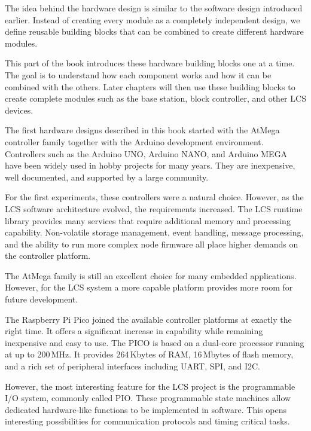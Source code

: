The idea behind the hardware design is similar to the software design introduced earlier. Instead of 
creating every module as a completely independent design, we define reusable building blocks that can 
be combined to create different hardware modules.

This part of the book introduces these hardware building blocks one at a time. The goal is to 
understand how each component works and how it can be combined with the others. Later chapters will 
then use these building blocks to create complete modules such as the base station, block controller, 
and other LCS devices.


The first hardware designs described in this book started with the AtMega controller family together 
with the Arduino development environment. Controllers such as the Arduino UNO, Arduino NANO, and 
Arduino MEGA have been widely used in hobby projects for many years. They are inexpensive, well 
documented, and supported by a large community.

For the first experiments, these controllers were a natural choice. However, as the LCS software 
architecture evolved, the requirements increased. The LCS runtime library provides many services 
that require additional memory and processing capability. Non-volatile storage management, event 
handling, message processing, and the ability to run more complex node firmware all place higher 
demands on the controller platform.

The AtMega family is still an excellent choice for many embedded applications. However, for the LCS 
system a more capable platform provides more room for future development.

The Raspberry Pi Pico joined the available controller platforms at exactly the right time. It offers 
a significant increase in capability while remaining inexpensive and easy to use. The PICO is based 
on a dual-core processor running at up to 200\,MHz. It provides 264\,Kbytes of RAM, 16\,Mbytes of 
flash memory, and a rich set of peripheral interfaces including UART, SPI, and I2C.

However, the most interesting feature for the LCS project is the programmable I/O system, commonly 
called PIO. These programmable state machines allow dedicated hardware-like functions to be 
implemented in software. This opens interesting possibilities for communication protocols and timing 
critical tasks.

